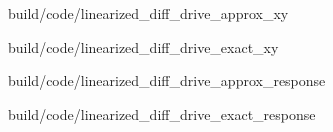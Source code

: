 \begin{bookfigure}
  \begin{minisvg}{build/code/linearized_diff_drive_approx_xy}
    \caption{Linearized differential drive controller x-y plot (approximate)}
    \label{fig:linearized_diff_drive_approx_xy}
  \end{minisvg}
  \hfill
  \begin{minisvg}{build/code/linearized_diff_drive_exact_xy}
    \caption{Linearized differential drive controller x-y plot (exact)}
    \label{fig:linearized_diff_drive_exact_xy2}
  \end{minisvg}
  \hfill
  \begin{minisvg}{build/code/linearized_diff_drive_approx_response}
    \caption{Linearized differential drive controller response (approximate)}
    \label{fig:linearized_diff_drive_approx_response}
  \end{minisvg}
  \hfill
  \begin{minisvg}{build/code/linearized_diff_drive_exact_response}
    \caption{Linearized differential drive controller response (exact)}
    \label{fig:linearized_diff_drive_exact_response2}
  \end{minisvg}
\end{bookfigure}
